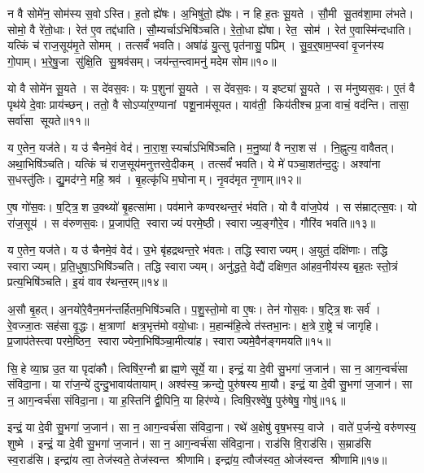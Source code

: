 न वै सोमे॑न॒ सोम॑स्य स॒वोऽस्ति।
ह॒तो ह्ये॑षः।
अ॒भिषु॑तो॒ ह्ये॑षः।
न हि ह॒तः सू॒यते।
सौ॒मी सू॒तव॑शा॒मा ल॑भते।
सोमो॒ वै रे॑तो॒धाः।
रेत॑ ए॒व तद्द॑धाति।
सौ॒म्यर्चाऽभिषि॑ञ्चति।
रे॒तो॒धा ह्ये॑षा।
रेत॒ सोम॑।
रेत॑ ए॒वास्मि॑न्दधाति।
यत्किं च॑ राज॒सूय॑मृ॒ते सोमम्।
तत्सर्वं॑ भवति।
अषा॑ढं यु॒त्सु पृत॑नासु॒ पप्रिम्।
सु॒व॒र्॒षाम॒प्स्वां वृ॒जन॑स्य गो॒पाम्।
भ॒रे॒षु॒जा सु॑क्षि॒ति सु॒श्रव॑सम्।
जय॑न्त॒न्त्वामनु॑ मदेम सोम॥१०॥\anuvakamend[रेत॒ सोम॑ स॒प्त च॑]

यो वै सोमे॑न सू॒यते।
स दे॑वस॒वः।
यः प॒शुना॑ सू॒यते।
स दे॑वस॒वः।
य इष्ट्या॑ सू॒यते।
स म॑नुष्यस॒वः।
ए॒तं वै पृथ॑ये दे॒वाः प्राय॑च्छन्।
ततो॒ वै सोऽप्या॑र॒ण्यानां पशू॒नाम॑सूयत।
याव॑ती॒ किय॑तीश्च प्र॒जा वाचं॒ वद॑न्ति।
तासा॒ सर्वा॑सा सूयते॥११॥

य ए॒तेन॒ यज॑ते।
य उ॑ चैनमे॒वं वेद॑।
ना॒रा॒श॒स्यर्चाऽभिषि॑ञ्चति।
म॒नु॒ष्या॑ वै नरा॒शस॑।
नि॒ह्नुत्य॒ वावैतत्।
अथा॒भिषि॑ञ्चति।
यत्किं च॑ राज॒सूय॑मनुत्तरवे॒दीकम्।
तत्सर्वं॑ भवति।
ये मे॑ पञ्चा॒शत॑न्द॒दुः।
अश्वा॑ना स॒धस्तु॑तिः।
द्यु॒मद॑ग्ने॒ महि॒ श्रव॑।
बृ॒हत्कृ॑धि म॒घोनाम्।
नृ॒वद॑मृत नृ॒णाम्॥१२॥\anuvakamend[सू॒य॒ते॒ स॒धस्तु॑ति॒स्त्रीणि॑ च]

ए॒ष गो॑स॒वः।
ष॒ट्त्रि॒श उ॒क्थ्यो॑ बृ॒हत्सा॑मा।
पव॑माने कण्वरथन्त॒रं भ॑वति।
यो वै वा॑ज॒पेय॑।
स स॑म्राट्त्स॒वः।
यो रा॑ज॒सूय॑।
स व॑रुणस॒वः।
प्र॒जाप॑ति॒ स्वाराज्यं परमे॒ष्ठी।
स्वाराज्य॒ङ्गौरे॒व।
गौरि॑व भवति॥१३॥

य ए॒तेन॒ यज॑ते।
य उ॑ चैनमे॒वं वेद॑।
उ॒भे बृ॑हद्रथन्त॒रे भ॑वतः।
तद्धि स्वाराज्यम्।
अ॒युतं॒ दक्षि॑णाः।
तद्धि स्वाराज्यम्।
प्र॒ति॒धुषा॒ऽभिषि॑ञ्चति।
तद्धि स्वाराज्यम्।
अनु॑द्धते॒ वेद्यै॑ दक्षिण॒त आ॑हव॒नीय॑स्य बृह॒तः स्तो॒त्रं प्रत्य॒भिषि॑ञ्चति।
इ॒यं वाव र॑थन्त॒रम्॥१४॥

अ॒सौ बृ॒हत्।
अ॒नयो॑रे॒वैन॒मन॑न्तर्\mbox{}हितम॒भिषि॑ञ्चति।
प॒शु॒स्तो॒मो वा ए॒षः।
तेन॑ गोस॒वः।
ष॒ट्त्रि॒शः सर्व॑।
रे॒वज्जा॒तः सह॑सा वृ॒द्धः।
क्ष॒त्राणां क्षत्र॒भृत्त॑मो वयो॒धाः।
म॒हान्म॑हि॒त्वे त॑स्तभा॒नः।
क्ष॒त्रे रा॒ष्ट्रे च॑ जागृहि।
प्र॒जाप॑तेस्त्वा परमे॒ष्ठिन॒ स्वाराज्येना॒भिषि॑ञ्चा॒मीत्या॑ह।
स्वाराज्यमे॒वैन॑ङ्गमयति॥१५॥\anuvakamend[इ॒व॒ भ॒व॒ति॒ र॒थ॒न्त॒रमा॒हैकं च]

सि॒हे व्या॒घ्र उ॒त या पृदा॑कौ।
त्विषि॑र॒ग्नौ ब्राह्म॒णे सूर्ये॒ या।
इन्द्रं॒ या दे॒वी सु॒भगा॑ ज॒जान॑।
सा न॒ आग॒न्वर्च॑सा संविदा॒ना।
या रा॑ज॒न्ये॑ दुन्दु॒भावाय॑तायाम्।
अश्व॑स्य॒ क्रन्द्ये॒ पुरु॑षस्य मा॒यौ।
इन्द्रं॒ या दे॒वी सु॒भगा॑ ज॒जान॑।
सा न॒ आग॒न्वर्च॑सा संविदा॒ना।
या ह॒स्तिनि॑ द्वी॒पिनि॒ या हिर॑ण्ये।
त्विषि॒रश्वे॑षु॒ पुरु॑षेषु॒ गोषु॑॥१६॥

इन्द्रं॒ या दे॒वी सु॒भगा॑ ज॒जान॑।
सा न॒ आग॒न्वर्च॑सा संविदा॒ना।
रथे॑ अ॒क्षेषु॑ वृष॒भस्य॒ वाजे।
वाते॑ प॒र्जन्ये॒ वरु॑णस्य॒ शुष्मे।
इन्द्रं॒ या दे॒वी सु॒भगा॑ ज॒जान॑।
सा न॒ आग॒न्वर्च॑सा संविदा॒ना।
राड॑सि वि॒राड॑सि।
स॒म्राड॑सि स्व॒राड॑सि।
इन्द्रा॑य त्वा॒ तेज॑स्वते॒ तेज॑स्वन्त श्रीणामि।
इन्द्रा॑य॒ त्वौज॑स्वत॒ ओज॑स्वन्त श्रीणामि॥१७॥

